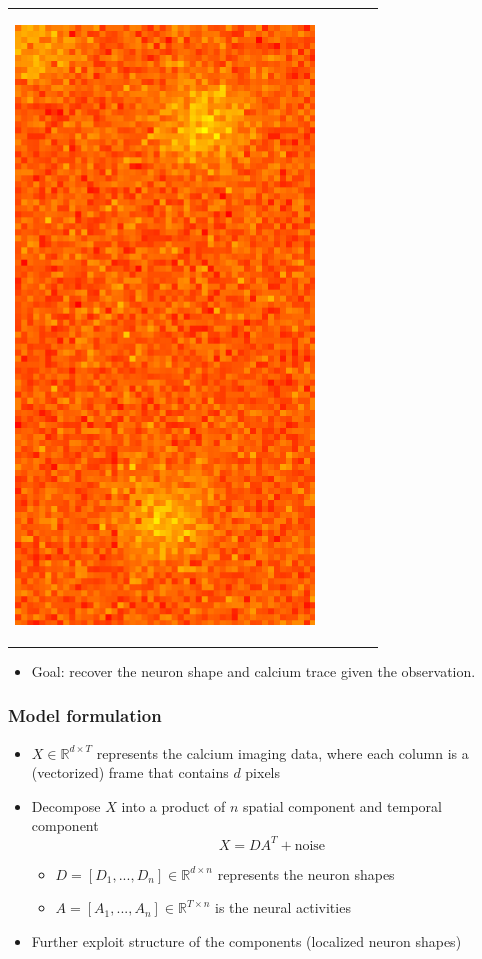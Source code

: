 \documentclass[16pt,presentation]{beamer}
\begin{document}
\begin{frame}
\begin{tabular}[t]{ccccc}
\begin{minipage}{0.06\textwidth}
\begin{center}
 \includegraphics[scale=0.2,clip = true]{figs/ROI_cartoon/fig_cartoon_frame_297.pdf}
  \end{center}
 \end{minipage}
\end{tabular}
\begin{itemize}
\item \alert{Goal}: recover the neuron shape and calcium trace given the observation.
\end{itemize}

\end{frame}

\begin{frame}
\frametitle{Model formulation}
\begin{itemize}
\item  $X \in \mathbb{R}^{d \times T}$ represents the calcium imaging data, where each column is a (vectorized) frame that contains $d$ pixels
\item Decompose $X$ into a product of $n$ \alert{spatial component} and \alert{temporal component}%
\[X = D A^T + \text{noise}\]
\begin{itemize}
\item $D = [D_1,...,D_n] \in \mathbb{R}^{d \times n}$ represents the neuron shapes
\item $A = [A_1,...,A_n] \in \mathbb{R}^{T \times n}$ is the neural activities%
\end{itemize}
\item Further exploit structure of the components (localized neuron shapes)
\end{itemize}
\end{frame}
\end{document}

